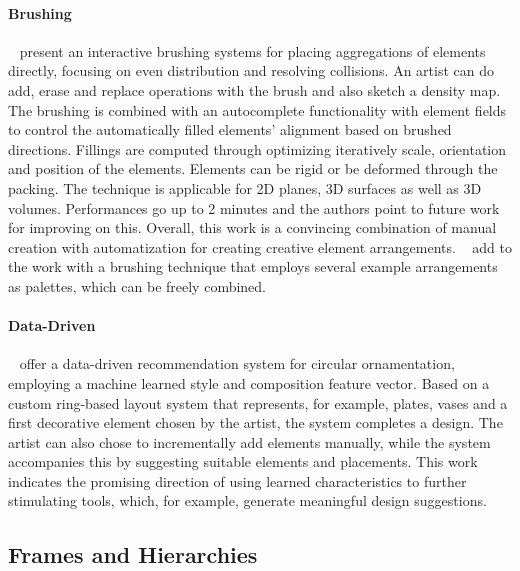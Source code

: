 \paragraph*{Brushing}
\label{para:analysis_element_arrangements_sketching}
\citeauthor*{hsu_2020_aef}~\cite{hsu_2020_aef}
present an interactive brushing systems for placing aggregations of elements directly, focusing on even distribution and resolving collisions. An artist can do add, erase and replace operations with the brush and also sketch a density map. The brushing is combined with an autocomplete functionality with element fields to control the automatically filled elements' alignment based on brushed directions. Fillings are computed through optimizing iteratively scale, orientation and position of the elements. Elements can be rigid or be deformed through the packing. The technique is applicable for 2D planes, 3D surfaces as well as 3D volumes. Performances go up to 2 minutes and the authors point to future work for improving on this. Overall, this work is a convincing combination of manual creation with automatization for creating creative element arrangements. \citeauthor*{davison_2019_ief}~\cite{davison_2019_ief} add to the work with a brushing technique that employs several example arrangements as palettes, which can be freely combined. 


\paragraph*{Data-Driven}
\label{para:analysis_element_arrangements_datadriven}

\citeauthor*{phan_2016_ple}~\cite{phan_2016_ple} offer a data-driven recommendation system for circular ornamentation, employing a machine learned style and composition feature vector. Based on a custom ring-based layout system that represents, for example, plates, vases and a first decorative element chosen by the artist, the system completes a design. The artist can also chose to incrementally add elements manually, while the system accompanies this by suggesting suitable elements and placements. This work indicates the promising direction of using learned characteristics to further stimulating tools, which, for example, generate meaningful design suggestions.



\subsection{Frames and Hierarchies}
\label{subsec:analysis_frames_and_hierarchies}

